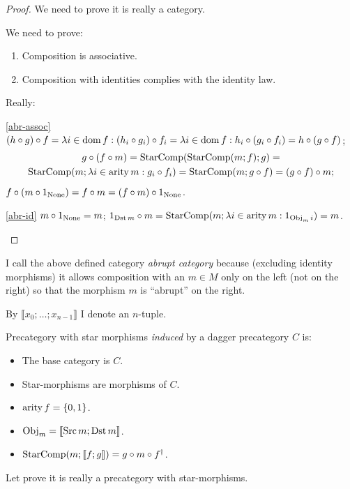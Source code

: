 \begin{proof}
We need to prove it is really a category.

We need to prove:
\begin{enumerate}
\item \label{abr-assoc}Composition is associative.
\item \label{abr-id}Composition with identities complies with the identity
law.
\end{enumerate}
Really:
\begin{widedisorder}
\item [{\ref{abr-assoc}}] $(h\circ g)\circ f=\lambda i\in\operatorname{dom} f:(h_{i}\circ g_{i})\circ f_{i}=\lambda i\in\operatorname{dom} f:h_{i}\circ(g_{i}\circ f_{i})=h\circ(g\circ f)$;
\begin{multline*}
g\circ(f\circ m)=\operatorname{StarComp}(\operatorname{StarComp}(m;f);g)=\\
\operatorname{StarComp}(m;\lambda i\in\operatorname{arity} m:g_{i}\circ f_{i})=\operatorname{StarComp}(m;g\circ f)=(g\circ f)\circ m;
\end{multline*}
$f\circ(m\circ1_{\operatorname{None}})=f\circ m=(f\circ m)\circ1_{\operatorname{None}}$.
\item [{\ref{abr-id}}] $m\circ1_{\operatorname{None}}=m$; $1_{\operatorname{Dst} m}\circ m=\operatorname{StarComp}(m;\lambda i\in\operatorname{arity} m:1_{\operatorname{Obj}_{m}i})=m$.
\end{widedisorder}
\end{proof}
\begin{rem}
I call the above defined category \emph{abrupt category} because (excluding
identity morphisms) it allows composition with an $m\in M$ only on
the left (not on the right) so that the morphism $m$ is ``abrupt''
on the right.
\end{rem}
By $\llbracket x_{0};\ldots;x_{n-1}\rrbracket$ I denote an $n$-tuple.
\begin{defn}
Precategory
with star morphisms \emph{induced} by a dagger precategory $C$ is: 
\begin{itemize}
\item The base category is $C$.
\item Star-morphisms are morphisms of $C$.
\item $\operatorname{arity} f=\{0,1\}$.
\item $\operatorname{Obj}_{m}=\llbracket\operatorname{Src} m;\operatorname{Dst} m\rrbracket$.
\item $\operatorname{StarComp}(m;\llbracket f;g\rrbracket)=g\circ m\circ f^{\dagger}$.
\end{itemize}
\end{defn}
Let prove it is really a precategory with star-morphisms.
